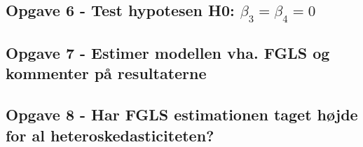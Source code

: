\documentclass[
]{article}
\begin{document}
\hypertarget{opgave-6---test-hypotesen-h0-beta_3-beta_4-0}{%
\subsection{\texorpdfstring{Opgave 6 - Test hypotesen H0:
\(\beta_3 = \beta_4 = 0\)}{Opgave 6 - Test hypotesen H0: \textbackslash beta\_3 = \textbackslash beta\_4 = 0}}\label{opgave-6---test-hypotesen-h0-beta_3-beta_4-0}}

\hypertarget{opgave-7---estimer-modellen-vha.-fgls-og-kommenter-puxe5-resultaterne}{%
\subsection{Opgave 7 - Estimer modellen vha. FGLS og kommenter på
resultaterne}\label{opgave-7---estimer-modellen-vha.-fgls-og-kommenter-puxe5-resultaterne}}

\hypertarget{opgave-8---har-fgls-estimationen-taget-huxf8jde-for-al-heteroskedasticiteten}{%
\subsection{Opgave 8 - Har FGLS estimationen taget højde for al
heteroskedasticiteten?}\label{opgave-8---har-fgls-estimationen-taget-huxf8jde-for-al-heteroskedasticiteten}}
\end{document}
